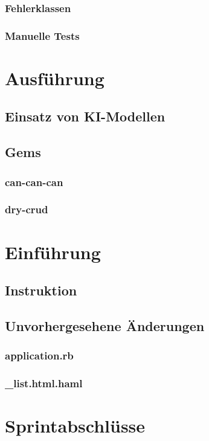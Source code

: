 \subsection{Fehlerklassen}
\subsection{Manuelle Tests}

\chapter{Ausführung}
\section{Einsatz von KI-Modellen}
\section{Gems}
\subsection{can-can-can}
\subsection{dry-crud}

\chapter{Einführung}
\section{Instruktion}

\section{Unvorhergesehene Änderungen}
\subsection{application.rb}
\subsection{\_list.html.haml}

\chapter{Sprintabschlüsse}

